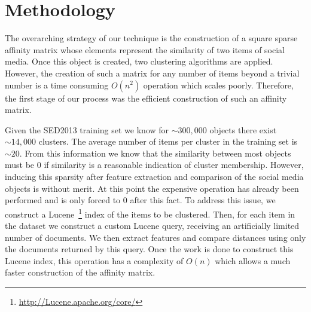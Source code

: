 \documentclass{../acm_proc_article-me11_tweaked}
\begin{document}

\section{Methodology} %
\label{sec:methodology}

The overarching strategy of our technique is the construction of a square sparse affinity matrix whose elements represent the similarity of two items of social media. Once this object is created, two clustering algorithms are applied. However, the creation of such a matrix for any number of items beyond a trivial number is a time consuming $O(n^2)$ operation which scales poorly. Therefore, the first stage of our process was the efficient construction of such an affinity matrix. 

Given the SED2013 training set we know for ${\sim}300,000$ objects there exist ${\sim}14,000$ clusters. The average number of items per cluster in the training set is ${\sim}20$. From this information we know that the similarity between most objects must be 0 if similarity is a reasonable indication of cluster membership. However, inducing this sparsity after feature extraction and comparison of the social media objects is without merit. At this point the expensive operation has already been performed and is only forced to 0 after this fact. To address this issue, we construct a Lucene~\footnote{\url{http://Lucene.apache.org/core/}} index of the items to be clustered. Then, for each item in the dataset we construct a custom Lucene query, receiving an artificially limited number of documents. We then extract features and compare distances using only the documents returned by this query. Once the work is done to construct this Lucene index, this operation has a complexity of $O(n)$ which allows a much faster construction of the affinity matrix.
\end{document}
